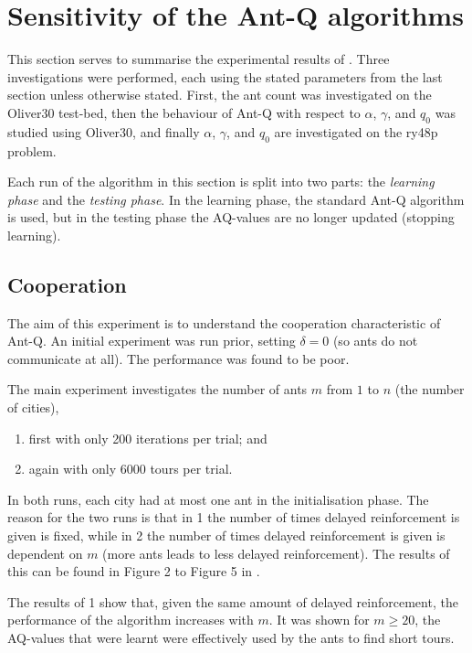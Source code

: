 \section{Sensitivity of the Ant-Q algorithms}

This section serves to summarise the experimental results of \cite{dorigo1996study}. Three investigations were performed, each using the stated parameters from the last section unless otherwise stated. First, the ant count was investigated on the Oliver30 test-bed, then the behaviour of Ant-Q with respect to $\alpha$, $\gamma$, and $q_0$ was studied using Oliver30, and finally $\alpha$, $\gamma$, and $q_0$ are investigated on the ry48p problem. 

Each run of the algorithm in this section is split into two parts: the \emph{learning phase} and the \emph{testing phase}. In the learning phase, the standard Ant-Q algorithm is used, but in the testing phase the AQ-values are no longer updated (stopping learning).

\subsection{Cooperation}

The aim of this experiment is to understand the cooperation characteristic of Ant-Q. An initial experiment was run prior, setting $\delta = 0$ (so ants do not communicate at all). The performance was found to be poor.

The main experiment investigates the number of ants $m$ from $1$ to $n$ (the number of cities), 
\begin{enumerate}
    \item first with only 200 iterations per trial; and 
    \item again with only 6000 tours per trial.
\end{enumerate} 
In both runs, each city had at most one ant in the initialisation phase. The reason for the two runs is that in 1 the number of times delayed reinforcement is given is fixed, while in 2 the number of times delayed reinforcement is given is dependent on $m$ (more ants leads to less delayed reinforcement). The results of this can be found in Figure 2 to Figure 5 in \cite{dorigo1996study}.

The results of 1 show that, given the same amount of delayed reinforcement, the performance of the algorithm increases with $m$. It was shown for $m \geq 20$, the AQ-values that were learnt were effectively used by the ants to find short tours. 

